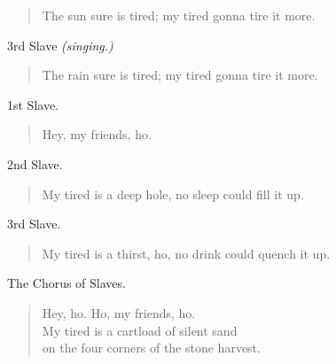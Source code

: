 \documentclass[letterpaper,article,12pt,oneside,notitlepage]{memoir}
\begin{document}
\begin{verse}
\hspace{1cm} The sun sure is tired; my tired gonna tire it more. \\
\end{verse}

\begin{center}3rd Slave \textit{(singing.)}\end{center}

\begin{verse}
\hspace{1cm} The rain sure is tired; my tired gonna tire it more. \\
\end{verse}

\begin{center}1st Slave.\end{center}

\begin{verse}
\hspace{1cm}  Hey, my friends, ho. \\
\end{verse}

\begin{center}2nd Slave.\end{center}

\begin{verse}
\hspace{1cm} My tired is a deep hole, no sleep could fill it up. \\
\end{verse}

\begin{center}3rd Slave.\end{center}

\begin{verse}
\hspace{1cm} My tired is a thirst, ho, no drink could quench it up. \\
\end{verse}

\begin{center}The Chorus of Slaves.\end{center}

\begin{verse}
\hspace{1cm}  Hey, ho. Ho, my friends, ho. \\
My tired is a cartload of silent sand \\
on the four corners of the stone harvest. \\
\end{verse}
\end{document}
